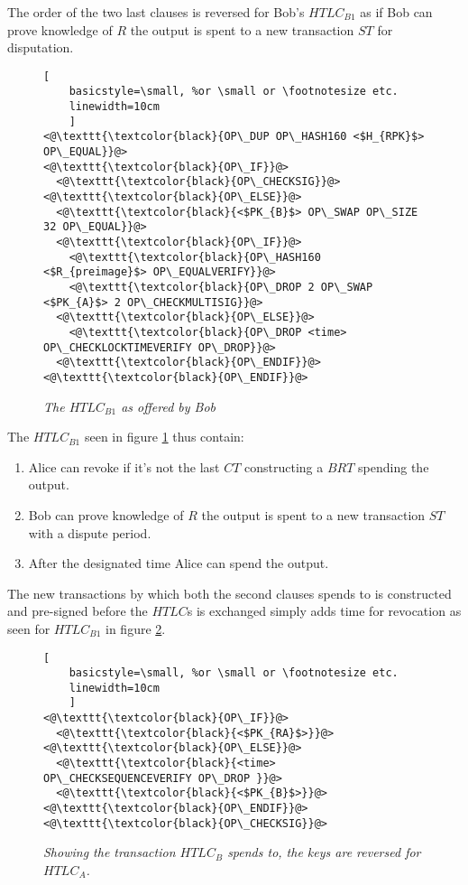 The order of the two last clauses is reversed for Bob's $HTLC_{B1}$ as if Bob can prove knowledge of $R$ the output is spent to a new transaction $ST$ for disputation.
\newpage
\begin{figure}[hbt!]
	
	\centering
	
	\begin{lstlisting}[
	basicstyle=\small, %or \small or \footnotesize etc.
	linewidth=10cm
	]
<@\texttt{\textcolor{black}{OP\_DUP OP\_HASH160 <$H_{RPK}$> OP\_EQUAL}}@>
<@\texttt{\textcolor{black}{OP\_IF}}@>
  <@\texttt{\textcolor{black}{OP\_CHECKSIG}}@>
<@\texttt{\textcolor{black}{OP\_ELSE}}@>
  <@\texttt{\textcolor{black}{<$PK_{B}$> OP\_SWAP OP\_SIZE 32 OP\_EQUAL}}@>
  <@\texttt{\textcolor{black}{OP\_IF}}@>
    <@\texttt{\textcolor{black}{OP\_HASH160 <$R_{preimage}$> OP\_EQUALVERIFY}}@> 
    <@\texttt{\textcolor{black}{OP\_DROP 2 OP\_SWAP <$PK_{A}$> 2 OP\_CHECKMULTISIG}}@>  
  <@\texttt{\textcolor{black}{OP\_ELSE}}@> 
    <@\texttt{\textcolor{black}{OP\_DROP <time> OP\_CHECKLOCKTIMEVERIFY OP\_DROP}}@> 	
  <@\texttt{\textcolor{black}{OP\_ENDIF}}@>
<@\texttt{\textcolor{black}{OP\_ENDIF}}@>
	\end{lstlisting}
	
	\caption{\textit{ The $HTLC_{B1}$ as offered by Bob
	}}
	\label{fig:bob:HTLC}
\end{figure}

The $HTLC_{B1}$ seen in figure \ref{fig:bob:HTLC} thus contain:

\begin{enumerate}
	\item Alice can revoke if it's not the last $CT$ constructing a $BRT$ spending the output.
	\item Bob can prove knowledge of $R$ the output is spent to a new transaction $ST$ with a dispute period.
	\item After the designated time Alice can spend the output.
\end{enumerate}

The new transactions by which both the second clauses spends to is constructed and pre-signed before the $HTLC$s is exchanged simply adds time for revocation as seen for $HTLC_{B1}$ in figure \ref{fig:timeout:tx}.

\begin{figure}[hbt!]
	
	\centering
	
	\begin{lstlisting}[
	basicstyle=\small, %or \small or \footnotesize etc.
	linewidth=10cm
	]
<@\texttt{\textcolor{black}{OP\_IF}}@>
  <@\texttt{\textcolor{black}{<$PK_{RA}$>}}@>
<@\texttt{\textcolor{black}{OP\_ELSE}}@>
  <@\texttt{\textcolor{black}{<time> OP\_CHECKSEQUENCEVERIFY OP\_DROP }}@>
  <@\texttt{\textcolor{black}{<$PK_{B}$>}}@>
<@\texttt{\textcolor{black}{OP\_ENDIF}}@>
<@\texttt{\textcolor{black}{OP\_CHECKSIG}}@>
	\end{lstlisting}
	
	\caption{\textit{ Showing the transaction $HTLC_{B}$ spends to, the keys are reversed for $HTLC_{A}$.
	}}
	\label{fig:timeout:tx}
\end{figure}

